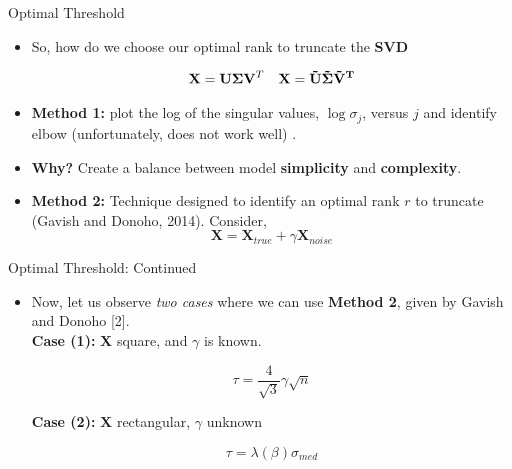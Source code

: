 \documentclass[9pt]{beamer}
\begin{document}
\begin{frame}{Optimal Threshold}
 
    \begin{itemize}
    
    \item So, how do we choose our optimal rank to truncate the \textbf{SVD}
    
    \begin{align*}
        \mathbf{X} = \mathbf{U\Sigma V}^{T} && \mathbf{X} = \mathbf{\Tilde{U}\Tilde{\Sigma}\Tilde{V}^{T}}
    \end{align*}
    
    \item \textbf{Method 1:} plot the log of the singular values, $\log \sigma_{j}$, versus $j$ and identify elbow (unfortunately, does not work well) .
    
    \item \textbf{Why?} Create a balance between model \textbf{simplicity} and \textbf{complexity}.
    
    \item \textbf{Method 2: } Technique designed to identify an optimal rank $r$ to truncate (Gavish and Donoho, 2014). Consider, \\
    
    \begin{equation}
        \mathbf{X} =\mathbf{X}_{true} + \gamma\mathbf{X}_{noise}
    \end{equation}
    
    \end{itemize}
    
\end{frame}

    
\begin{frame}{Optimal Threshold: Continued}
    \begin{itemize}
        \item Now, let us observe \textit{two cases} where we can use \textbf{Method 2}, given by Gavish and Donoho [2].\\
        
        \textbf{Case (1): } $\mathbf{X}$ square, and $\gamma$ is known. 
        
        \begin{equation}
            \tau = \frac{4}{\sqrt{3}}\gamma \sqrt{n}
        \end{equation}
        
        \textbf{Case (2): } $\mathbf{X}$ rectangular, $\gamma$ unknown
        
        \begin{equation}
            \tau = \lambda(\beta)\sigma_{med}
        \end{equation}
        
    \end{itemize}
\end{frame}
\end{document}
